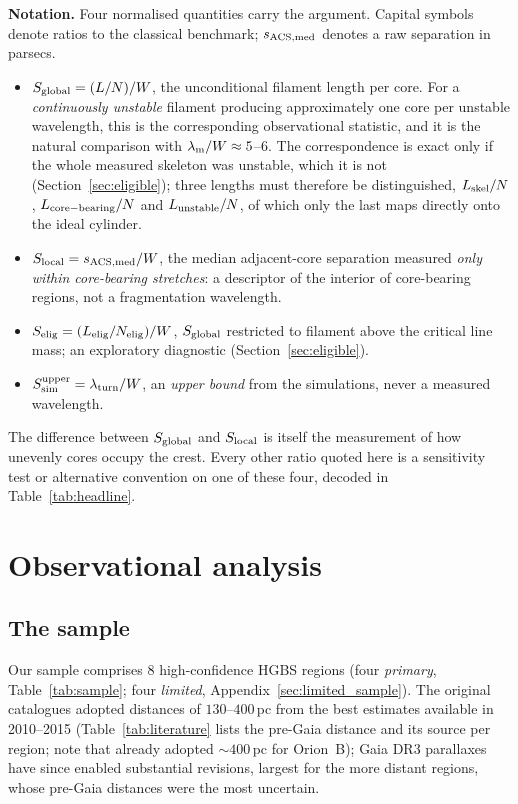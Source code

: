 \documentclass[usenatbib,twoside,twocolumn]{mnras}
\begin{document}
\noindent\textbf{Notation.} Four normalised quantities carry the argument. Capital symbols denote ratios to the classical benchmark; $s_{\rm ACS,med}$ denotes a raw separation in parsecs.
\begin{itemize}\setlength{\itemsep}{1pt}
\item $S_{\rm global}=(L/N)/W$, the unconditional filament length per core. For a \emph{continuously unstable} filament producing approximately one core per unstable wavelength, this is the corresponding observational statistic, and it is the natural comparison with $\lambda_{\rm m}/W\approx5$--$6$. The correspondence is exact only if the whole measured skeleton was unstable, which it is not (Section~\ref{sec:eligible}); three lengths must therefore be distinguished, $L_{\rm skel}/N$, $L_{\rm core-bearing}/N$ and $L_{\rm unstable}/N$, of which only the last maps directly onto the ideal cylinder.
\item $S_{\rm local}=s_{\rm ACS,med}/W$, the median adjacent-core separation measured \emph{only within core-bearing stretches}: a descriptor of the interior of core-bearing regions, not a fragmentation wavelength.
\item $S_{\rm elig}=(L_{\rm elig}/N_{\rm elig})/W$, $S_{\rm global}$ restricted to filament above the critical line mass; an exploratory diagnostic (Section~\ref{sec:eligible}).
\item $S_{\rm sim}^{\rm upper}=\lambda_{\rm turn}/W$, an \emph{upper bound} from the simulations, never a measured wavelength.
\end{itemize}
The difference between $S_{\rm global}$ and $S_{\rm local}$ is itself the measurement of how unevenly cores occupy the crest. Every other ratio quoted here is a sensitivity test or alternative convention on one of these four, decoded in Table~\ref{tab:headline}.

\section{Observational analysis}

\subsection{The sample}

Our sample comprises 8 high-confidence HGBS regions (four \emph{primary}, Table~\ref{tab:sample}; four \emph{limited}, Appendix~\ref{sec:limited_sample}). The original catalogues \citep{Konyves2015, Konyves2020, Ladjelate2020, Pezzuto2021} adopted distances of $130$--$400$\,pc from the best estimates available in 2010--2015 (Table~\ref{tab:literature} lists the pre-Gaia distance and its source per region; note that \citealt{Konyves2020} already adopted $\sim400$\,pc for Orion~B); Gaia DR3 parallaxes \citep{Zhang2023} have since enabled substantial revisions, largest for the more distant regions, whose pre-Gaia distances were the most uncertain.
\end{document}
